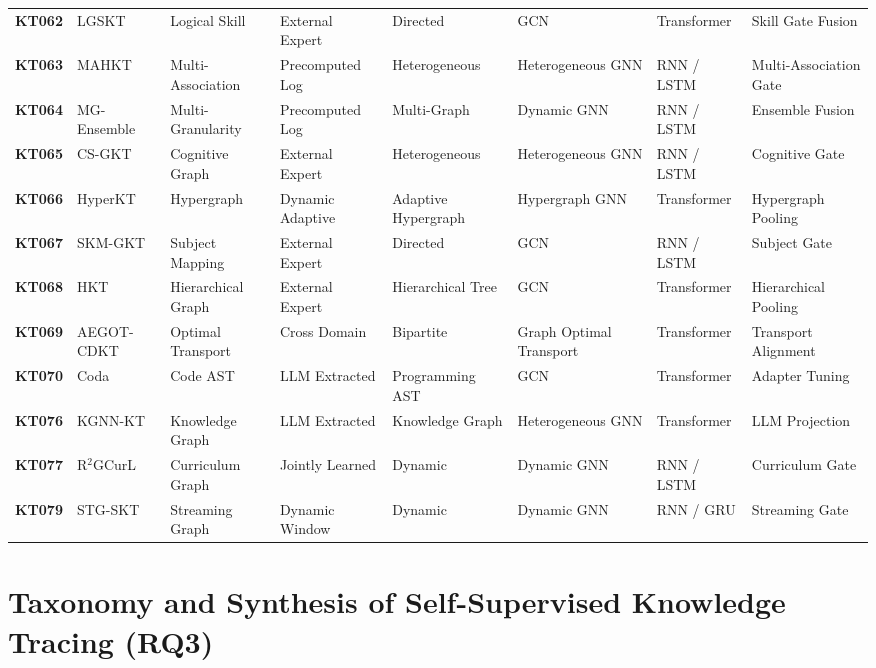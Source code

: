 ﻿\documentclass[10pt,journal,compsoc]{IEEEtran}
\begin{document}
\begin{table}[t]
{\begin{tabular}{@{}l l l l l l l l@{}}
\textbf{KT062} & LGSKT \cite{KT062_LGSKT_2025} & Logical Skill & External Expert & Directed & GCN & Transformer & Skill Gate Fusion \\
\textbf{KT063} & MAHKT \cite{KT063_MAHKT_2025} & Multi-Association & Precomputed Log & Heterogeneous & Heterogeneous GNN & RNN / LSTM & Multi-Association Gate \\
\textbf{KT064} & MG-Ensemble \cite{KT064_MGEnsemble_2025} & Multi-Granularity & Precomputed Log & Multi-Graph & Dynamic GNN & RNN / LSTM & Ensemble Fusion \\
\textbf{KT065} & CS-GKT \cite{KT065_CSGKT_2025} & Cognitive Graph & External Expert & Heterogeneous & Heterogeneous GNN & RNN / LSTM & Cognitive Gate \\
\textbf{KT066} & HyperKT \cite{KT066_HyperKT_2025} & Hypergraph & Dynamic Adaptive & Adaptive Hypergraph & Hypergraph GNN & Transformer & Hypergraph Pooling \\
\textbf{KT067} & SKM-GKT \cite{KT067_SKMGKT_2025} & Subject Mapping & External Expert & Directed & GCN & RNN / LSTM & Subject Gate \\
\textbf{KT068} & HKT \cite{KT068_HKT_2025} & Hierarchical Graph & External Expert & Hierarchical Tree & GCN & Transformer & Hierarchical Pooling \\
\textbf{KT069} & AEGOT-CDKT \cite{KT069_AEGOTCDKT_2025} & Optimal Transport & Cross Domain & Bipartite & Graph Optimal Transport & Transformer & Transport Alignment \\
\textbf{KT070} & Coda \cite{KT070_Coda_2025} & Code AST & LLM Extracted & Programming AST & GCN & Transformer & Adapter Tuning \\
\textbf{KT076} & KGNN-KT \cite{KT076_KGNNKT_2025} & Knowledge Graph & LLM Extracted & Knowledge Graph & Heterogeneous GNN & Transformer & LLM Projection \\
\textbf{KT077} & R$^2$GCurL \cite{KT077_R2GCurL_2026} & Curriculum Graph & Jointly Learned & Dynamic & Dynamic GNN & RNN / LSTM & Curriculum Gate \\
\textbf{KT079} & STG-SKT \cite{KT079_STGSKT_2026} & Streaming Graph & Dynamic Window & Dynamic & Dynamic GNN & RNN / GRU & Streaming Gate \\
\bottomrule
\end{tabular}
}
\end{table}

\section{Taxonomy and Synthesis of Self-Supervised Knowledge Tracing (RQ3)}
\end{document}
